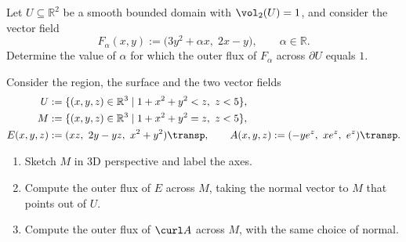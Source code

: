 \begin{exercise}
\label{ex:tuning_alpha_prescribed_flux}
Let $U \subseteq \mathbb{R}^2$ be a smooth bounded domain with $\vol_2(U) = 1$, and consider the
vector field
\[F_\alpha(x,y) := \big(3y^2 + \alpha x,\; 2x - y\big), \qquad \alpha \in \mathbb{R}.\]
Determine the value of $\alpha$ for which the outer flux of $F_\alpha$ across $\partial U$ equals
$1$.
\end{exercise}

\begin{exercise}
\label{ex:flux_truncated_paraboloid}
Consider the region, the surface and the two vector fields
\begin{align*}
  U &:= \{(x,y,z) \in \mathbb{R}^3 \mid 1+x^2+y^2 < z,\ z < 5\}, \\
  M &:= \{(x,y,z) \in \mathbb{R}^3 \mid 1+x^2+y^2 = z,\ z < 5\}, \\
  E(x,y,z) &:= (xz,\ 2y-yz,\ x^2+y^2)\transp, \qquad
  A(x,y,z) := (-ye^z,\ xe^z,\ e^z)\transp .
\end{align*}
\begin{enumerate}[label=\textbf{(\alph*)}]
  \item Sketch $M$ in 3D perspective and label the axes.
  \item Compute the outer flux of $E$ across $M$, taking the normal vector to $M$ that points out
    of $U$.
  \item Compute the outer flux of $\curl A$ across $M$, with the same choice of normal.
\end{enumerate}
\end{exercise}

